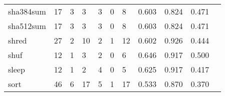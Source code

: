 \begin{longtable}{lp{1.2cm}p{1.2cm}p{1.2cm}p{1.2cm}p{1.2cm}p{1.2cm}p{1.2cm}p{1.2cm}p{1.2cm}p{1.2cm}}
sha384sum &                                    17 &                                                  3 &                                                  3 &                                                  3 &                                                  0 &                                                  8 &                                              0.603 &                                              0.824 &                                              0.471 \\
sha512sum &                                    17 &                                                  3 &                                                  3 &                                                  3 &                                                  0 &                                                  8 &                                              0.603 &                                              0.824 &                                              0.471 \\
shred     &                                    27 &                                                  2 &                                                 10 &                                                  2 &                                                  1 &                                                 12 &                                              0.602 &                                              0.926 &                                              0.444 \\
shuf      &                                    12 &                                                  1 &                                                  3 &                                                  2 &                                                  0 &                                                  6 &                                              0.646 &                                              0.917 &                                              0.500 \\
sleep     &                                    12 &                                                  1 &                                                  2 &                                                  4 &                                                  0 &                                                  5 &                                              0.625 &                                              0.917 &                                              0.417 \\
sort      &                                    46 &                                                  6 &                                                 17 &                                                  5 &                                                  1 &                                                 17 &                                              0.533 &                                              0.870 &                                              0.370 \\

\end{longtable}
